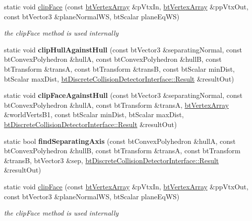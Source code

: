\begin{DoxyCompactItemize}
static void \hyperlink{structbtPolyhedralContactClipping_a1ab4d8cdb0e9cce0dbba7843c29c0f0d}{clip\+Face} (const \hyperlink{classbtAlignedObjectArray}{bt\+Vertex\+Array} \&p\+Vtx\+In, \hyperlink{classbtAlignedObjectArray}{bt\+Vertex\+Array} \&pp\+Vtx\+Out, const bt\+Vector3 \&plane\+Normal\+WS, bt\+Scalar plane\+Eq\+WS)
\begin{DoxyCompactList}\small\item\em the clip\+Face method is used internally \end{DoxyCompactList}\item 
\mbox{\label{structbtPolyhedralContactClipping_ad3b9b324e8ed4c06df98be9436058082}} 
static void {\bfseries clip\+Hull\+Against\+Hull} (const bt\+Vector3 \&separating\+Normal, const bt\+Convex\+Polyhedron \&hullA, const bt\+Convex\+Polyhedron \&hullB, const bt\+Transform \&transA, const bt\+Transform \&transB, const bt\+Scalar min\+Dist, bt\+Scalar max\+Dist, \hyperlink{structbtDiscreteCollisionDetectorInterface_1_1Result}{bt\+Discrete\+Collision\+Detector\+Interface\+::\+Result} \&result\+Out)
\item 
\mbox{\label{structbtPolyhedralContactClipping_a9900d3d628f4f50f91b67bee354864fd}} 
static void {\bfseries clip\+Face\+Against\+Hull} (const bt\+Vector3 \&separating\+Normal, const bt\+Convex\+Polyhedron \&hullA, const bt\+Transform \&transA, \hyperlink{classbtAlignedObjectArray}{bt\+Vertex\+Array} \&world\+Verts\+B1, const bt\+Scalar min\+Dist, bt\+Scalar max\+Dist, \hyperlink{structbtDiscreteCollisionDetectorInterface_1_1Result}{bt\+Discrete\+Collision\+Detector\+Interface\+::\+Result} \&result\+Out)
\item 
\mbox{\label{structbtPolyhedralContactClipping_a65ddca10ec260ec9b7f03b9831f12433}} 
static bool {\bfseries find\+Separating\+Axis} (const bt\+Convex\+Polyhedron \&hullA, const bt\+Convex\+Polyhedron \&hullB, const bt\+Transform \&transA, const bt\+Transform \&transB, bt\+Vector3 \&sep, \hyperlink{structbtDiscreteCollisionDetectorInterface_1_1Result}{bt\+Discrete\+Collision\+Detector\+Interface\+::\+Result} \&result\+Out)
\item 
\mbox{\label{structbtPolyhedralContactClipping_a6a9b9ff16a7a4a443509661cef3b97da}} 
static void \hyperlink{structbtPolyhedralContactClipping_a6a9b9ff16a7a4a443509661cef3b97da}{clip\+Face} (const \hyperlink{classbtAlignedObjectArray}{bt\+Vertex\+Array} \&p\+Vtx\+In, \hyperlink{classbtAlignedObjectArray}{bt\+Vertex\+Array} \&pp\+Vtx\+Out, const bt\+Vector3 \&plane\+Normal\+WS, bt\+Scalar plane\+Eq\+WS)
\begin{DoxyCompactList}\small\item\em the clip\+Face method is used internally \end{DoxyCompactList}\end{DoxyCompactItemize}


